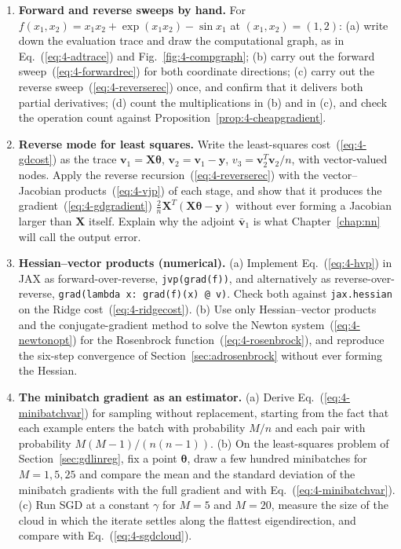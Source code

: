 \begin{enumerate}
\item \textbf{Forward and reverse sweeps by hand.}
  For $f(x_1,x_2)=x_1x_2+\exp(x_1x_2)-\sin x_1$ at $(x_1,x_2)=(1,2)$:
  (a) write down the evaluation trace and draw the computational graph, as
      in Eq.~(\ref{eq:4-adtrace}) and Fig.~\ref{fig:4-compgraph};
  (b) carry out the forward sweep~(\ref{eq:4-forwardrec}) for both
      coordinate directions;
  (c) carry out the reverse sweep~(\ref{eq:4-reverserec}) once, and confirm
      that it delivers both partial derivatives;
  (d) count the multiplications in (b) and in (c), and check the operation
      count against Proposition~\ref{prop:4-cheapgradient}.

\item \textbf{Reverse mode for least squares.}
  Write the least-squares cost~(\ref{eq:4-gdcost}) as the trace
  $\bm{v}_1=\bm{X}\bm{\theta}$, $\bm{v}_2=\bm{v}_1-\bm{y}$,
  $v_3=\bm{v}_2^{T}\bm{v}_2/n$, with vector-valued nodes.  Apply the reverse
  recursion~(\ref{eq:4-reverserec}) with the vector--Jacobian
  products~(\ref{eq:4-vjp}) of each stage, and show that it produces the
  gradient~(\ref{eq:4-gdgradient}) $\frac{2}{n}\bm{X}^{T}(\bm{X}\bm{\theta}-\bm{y})$
  without ever forming a Jacobian larger than $\bm{X}$ itself.  Explain why
  the adjoint $\bar{\bm{v}}_1$ is what Chapter~\ref{chap:nn} will call the
  output error.

\item \textbf{Hessian--vector products (numerical).}
  (a) Implement Eq.~(\ref{eq:4-hvp}) in JAX as forward-over-reverse,
      \texttt{jvp(grad(f))}, and alternatively as reverse-over-reverse,
      \texttt{grad(lambda x: grad(f)(x) @ v)}.  Check both against \texttt{jax.hessian}
      on the Ridge cost~(\ref{eq:4-ridgecost}).
  (b) Use only Hessian--vector products and the conjugate-gradient method to
      solve the Newton system~(\ref{eq:4-newtonopt}) for the Rosenbrock
      function~(\ref{eq:4-rosenbrock}), and reproduce the six-step
      convergence of Section~\ref{sec:adrosenbrock} without ever forming
      the Hessian.

\item \textbf{The minibatch gradient as an estimator.}
  (a) Derive Eq.~(\ref{eq:4-minibatchvar}) for sampling without replacement,
      starting from the fact that each example enters the batch with
      probability $M/n$ and each pair with probability $M(M-1)/(n(n-1))$.
  (b) On the least-squares problem of Section~\ref{sec:gdlinreg}, fix a point
      $\bm{\theta}$, draw a few hundred minibatches for $M=1,5,25$ and compare
      the mean and the standard deviation of the minibatch gradients with the
      full gradient and with Eq.~(\ref{eq:4-minibatchvar}).
  (c) Run SGD at a constant $\gamma$ for $M=5$ and $M=20$, measure the size of
      the cloud in which the iterate settles along the flattest
      eigendirection, and compare with Eq.~(\ref{eq:4-sgdcloud}).


\end{enumerate}
